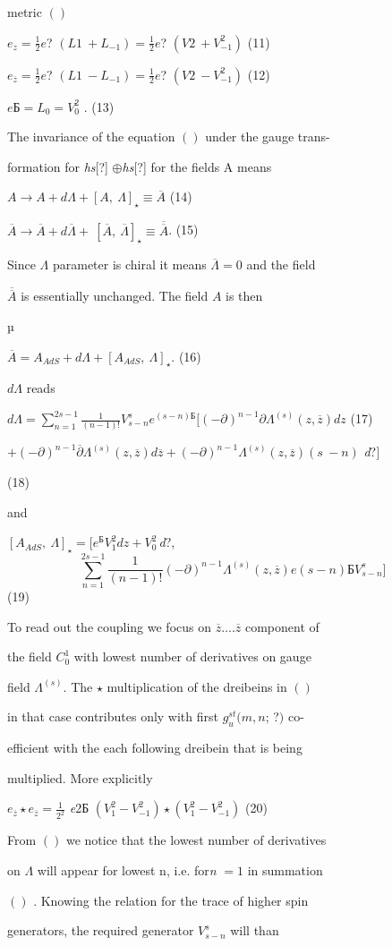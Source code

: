 \documentclass[a4paper,12pt]{article}
\begin{document}
metric $()$
\begin{center}
$e_{z}=\displaystyle \frac{1}{2} e$? $(L1\displaystyle \ +L_{-1})=\frac{1}{2} e$? $(V2\ +V_{-1}^{2})$   (11)

$e_{\overline{z}}=\displaystyle \frac{1}{2} e$? $(L1\displaystyle \ -L_{-1})=\frac{1}{2} e$? $(V2\ -V_{-1}^{2})$   (12)

$eБ=L_{0}=V_{0}^{2}$ .   (13)
\end{center}
The invariance of the equation $()$ under the gauge trans-

formation for {\it hs}[?] $\oplus${\it hs}[?] for the fields A means
\begin{center}
$A\rightarrow A+d\Lambda+[A,\ \Lambda]_{\star}\equiv\overline{A}$   (14)

$\overline{A}\rightarrow\overline{A}+d\overline{\Lambda}+\ [\overline{A},\ \overline{\Lambda}]_{\star}\equiv\overline{\overline{A}}$.   (15)
\end{center}
Since $\Lambda$ parameter is chiral it means $\overline{\Lambda}=0$ and the field

$\overline{\overline{A}}$ is essentially unchanged. The field $A$ is then

µ
\begin{center}
$\overline{A}=A_{AdS}+d\Lambda+[A_{AdS},\ \Lambda]_{\star}$.   (16)
\end{center}
$ d\Lambda$ reads

$d\displaystyle \Lambda=\sum_{n=1}^{2s-1}\frac{1}{(n-1)!}V_{s-n}^{s}e^{(s-n)Б}[(-\partial)^{n-1}\partial\Lambda^{(s)}(z,\overline{z})dz$ (17)

$+(-\partial)^{n-1}\overline{\partial}\Lambda^{(s)}(z,\overline{z})d\overline{z}+(-\partial)^{n-1}\Lambda^{(s)}(z,\overline{z})(s\ - n)$ {\it d}?$]$

(18)

and

$[A_{AdS},\ \Lambda]_{\star}=[e^{Б}V_{1}^{2}dz+V_{0\ }^{2}${\it d}?,
$$
\sum_{n=1}^{2s-1}\frac{1}{(n-1)!}(-\partial)^{n-1}\Lambda^{(s)}(z,\overline{z})e(s-n)Б V_{s-n}^{s}]
$$
(19)

To read out the coupling we focus on $\overline{z}\ldots.\overline{z}$ component of

the field $C_{0}^{1}$ with lowest number of derivatives on gauge

field $\Lambda^{(s)}$. The $\star$ multiplication of the dreibeins in $()$

in that case contributes only with first $g_{u}^{st} (m, n$; ?$)$ co-

efficient with the each following dreibein that is being

multiplied. More explicitly

$e_{\overline{z}}\displaystyle \star e_{\overline{z}}=\frac{1}{2^{2}}$ {\it e}2Б $(V_{1}^{2}-V_{-1}^{2})\star(V_{1}^{2}-V_{-1}^{2})$ (20)

From $()$ we notice that the lowest number of derivatives

on $\Lambda$ will appear for lowest $\mathrm{n}$, i.e. for{\it n} $=1$ in summation

$()$ . Knowing the relation for the trace of higher spin

generators, the required generator $V_{s-n}^{s}$ will than
\end{document}
